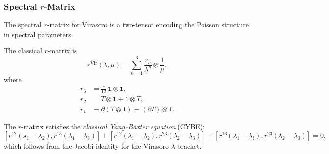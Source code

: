 \subsubsection{Spectral $r$-Matrix}

The spectral $r$-matrix for Virasoro is a two-tensor encoding the Poisson structure in spectral parameters.

\begin{definition}
\label{def:vir-r-matrix}
The classical $r$-matrix is
\begin{equation}
r^{\text{Vir}}(\lambda, \mu) = \sum_{n=1}^3 \frac{r_n}{\lambda^n} \otimes \frac{1}{\mu},
\end{equation}
where
\begin{align}
r_3 &= \frac{c}{12} \, \mathbf{1} \otimes \mathbf{1},\\
r_2 &= T \otimes \mathbf{1} + \mathbf{1} \otimes T,\\
r_1 &= \partial(T \otimes \mathbf{1}) = (\partial T) \otimes \mathbf{1}.
\end{align}
\end{definition}

The $r$-matrix satisfies the \emph{classical Yang--Baxter equation} (CYBE):
\begin{equation}
\label{eq:vir-CYBE}
[r^{12}(\lambda_1-\lambda_2), r^{13}(\lambda_1-\lambda_3)] + [r^{12}(\lambda_1-\lambda_2), r^{23}(\lambda_2-\lambda_3)] + [r^{13}(\lambda_1-\lambda_3), r^{23}(\lambda_2-\lambda_3)] = 0,
\end{equation}
which follows from the Jacobi identity for the Virasoro $\lambda$-bracket.


